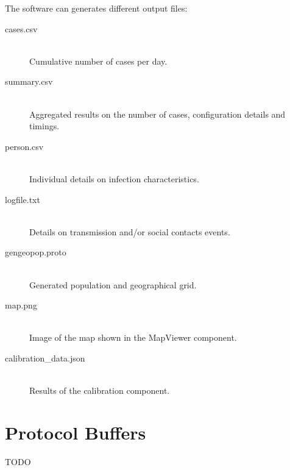 The software can generates different output files:
\begin{description}
	\item [cases.csv] \ \\
	Cumulative number of cases per day.
	\item [summary.csv] \ \\
	Aggregated results on the number of cases, configuration details and timings.
	\item [person.csv] \ \\
	Individual details on infection characteristics.
	\item [logfile.txt] \ \\
	Details on transmission and/or social contacts events.
    \item [gengeopop.proto] \ \\
    Generated population and geographical grid.
    \item [map.png] \ \\
    Image of the map shown in the MapViewer component.
    \item [calibration\_data.json] \ \\
    Results of the calibration component.
\end{description}


\section{Protocol Buffers}
\label{section:protobuf}
TODO

